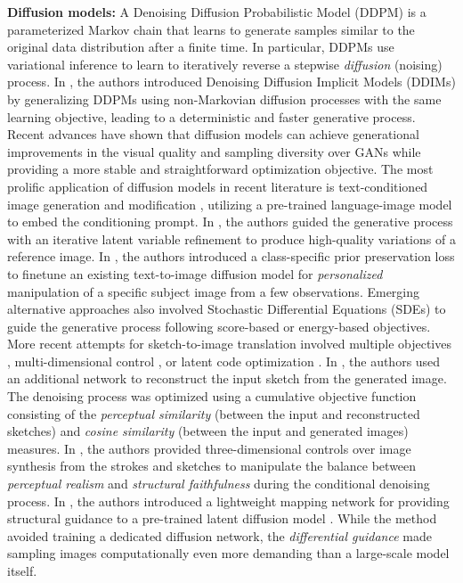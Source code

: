 \noindent
\textbf{Diffusion models:} A Denoising Diffusion Probabilistic Model (DDPM) \cite{ho2020denoising,sohl2015deep} is a parameterized Markov chain that learns to generate samples similar to the original data distribution after a finite time. In particular, DDPMs use variational inference to learn to iteratively reverse a stepwise \emph{diffusion} (noising) process. In \cite{song2020denoising}, the authors introduced Denoising Diffusion Implicit Models (DDIMs) by generalizing DDPMs using non-Markovian diffusion processes with the same learning objective, leading to a deterministic and faster generative process. Recent advances \cite{dhariwal2021diffusion,nichol2021improved} have shown that diffusion models can achieve generational improvements in the visual quality and sampling diversity over GANs while providing a more stable and straightforward optimization objective. The most prolific application of diffusion models in recent literature is text-conditioned image generation \cite{ramesh2022hierarchical,ramesh2021zero,rombach2022high,saharia2022photorealistic} and modification \cite{bar2022text2live,brooks2023instructpix2pix,hertz2023prompt,mokady2023null}, utilizing a pre-trained language-image model \cite{radford2021learning} to embed the conditioning prompt. In \cite{choi2021ilvr}, the authors guided the generative process with an iterative latent variable refinement to produce high-quality variations of a reference image. In \cite{ruiz2023dreambooth}, the authors introduced a class-specific prior preservation loss to finetune an existing text-to-image diffusion model for \emph{personalized} manipulation of a specific subject image from a few observations. Emerging alternative approaches also involved Stochastic Differential Equations (SDEs) to guide the generative process following score-based \cite{meng2021sdedit} or energy-based \cite{xing2023inversion,zhao2022egsde} objectives. More recent attempts for sketch-to-image translation involved multiple objectives \cite{wang2022diffsketching}, multi-dimensional control \cite{cheng2023adaptively}, or latent code optimization \cite{voynov2023sketch}. In \cite{wang2022diffsketching}, the authors used an additional network to reconstruct the input sketch from the generated image. The denoising process was optimized using a cumulative objective function consisting of the \emph{perceptual similarity} (between the input and reconstructed sketches) and \emph{cosine similarity} (between the input and generated images) measures. In \cite{cheng2023adaptively}, the authors provided three-dimensional controls over image synthesis from the strokes and sketches to manipulate the balance between \emph{perceptual realism} and \emph{structural faithfulness} during the conditional denoising process. In \cite{voynov2023sketch}, the authors introduced a lightweight mapping network for providing structural guidance to a pre-trained latent diffusion model \cite{rombach2022high}. While the method avoided training a dedicated diffusion network, the \emph{differential guidance} made sampling images computationally even more demanding than a large-scale model itself.
